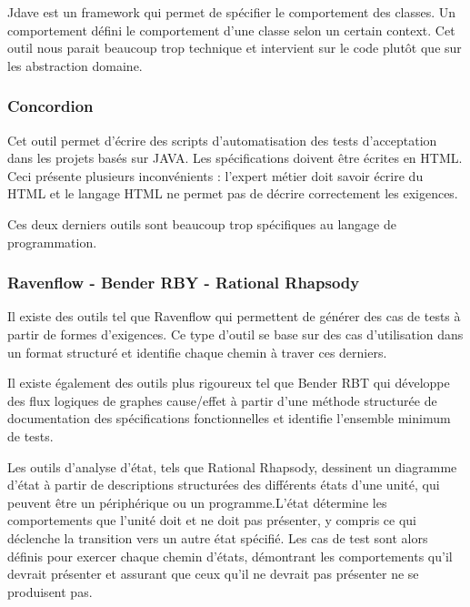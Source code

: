         Jdave est un framework qui permet de spécifier le comportement des classes. Un comportement défini le comportement d'une classe selon un certain context. Cet outil nous parait beaucoup trop technique et intervient sur le code plutôt que sur les abstraction domaine. 
        
        \subsubsection{Concordion}
        Cet outil permet d'écrire des scripts d'automatisation des tests d'acceptation dans les projets basés sur JAVA. Les spécifications doivent être écrites en HTML. Ceci présente plusieurs inconvénients : l'expert métier doit savoir écrire du HTML et le langage HTML ne permet pas de décrire correctement les exigences.
        
        Ces deux derniers outils sont beaucoup trop spécifiques au langage de programmation.

        \subsubsection{Ravenflow - Bender RBY - Rational Rhapsody }
        
        Il existe des outils tel que Ravenflow qui permettent de générer des cas de tests à partir de formes d'exigences. Ce type d'outil se base sur des cas d'utilisation dans un format structuré et identifie chaque chemin à traver ces derniers. 
        
        Il existe également des outils plus rigoureux tel que Bender RBT qui développe des flux logiques de graphes cause/effet à partir d'une méthode structurée de documentation des spécifications fonctionnelles et identifie l'ensemble minimum de tests.
        
        Les outils d'analyse d'état, tels que Rational Rhapsody, dessinent un diagramme d'état à partir de descriptions structurées des différents états d'une unité, qui peuvent être un périphérique ou un programme.L'état détermine les comportements que l'unité doit et ne doit pas présenter, y compris ce qui déclenche la transition vers un autre état spécifié. Les cas de test sont alors définis pour exercer chaque chemin d'états, démontrant les comportements qu'il devrait présenter et assurant que ceux qu'il ne devrait pas présenter ne se produisent pas.
    
